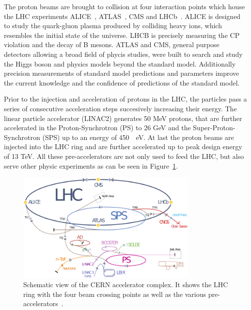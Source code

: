 The proton beams are brought to collision at four interaction points which house
the LHC experiments ALICE~\cite{ALICE}, ATLAS~\cite{ATLASa}, CMS and
LHCb~\cite{LHCb}. ALICE is designed to study the quark-gluon plasma produced by
colliding heavy ions, which resembles the initial state of the universe. LHCB is
precisely measuring the CP violation and the decay of B mesons. ATLAS and CMS,
general purpose detectors allowing a broad field of phycis studies, were built
to search and study the Higgs boson and physics models beyond the standard
model. Additionally precision measurements of standard model predictions and
parameters improve the current knowledge and the confidence of predictions of
the standard model.

Prior to the injection and acceleration of protons in the LHC, the particles
pass a series of consecutive acceleration steps succesively increasing their
energy. The linear particle accelerator (LINAC2) generates 50 MeV protons, that
are further accelerated in the Proton-Synchrotron (PS) to 26 GeV and
the Super-Proton-Synchrotron (SPS) up to an energy of \SI{450}{\giga
\electronvolt}. At last the proton beams are injected into the LHC ring and are
further accelerated up to peak design energy of 13 TeV. All these
pre-accelerators are not only used to feed the LHC, but also serve other physic
experiments as can be seen in Figure~\ref{fig:lhc_complex}.

\begin{figure}[htp]
    \centering
    \includegraphics[width=0.8\textwidth]{figures/cms_detector/lhc_accelerator_chain.pdf}
    \caption[CERN accelerator complex]{Schematic view of the CERN
        accelerator complex. It shows the LHC ring  with the four beam crossing
        points as well as the various pre-accelerators~\cite{LHC:COMPLEX}.}
    \label{fig:lhc_complex}
\end{figure}

